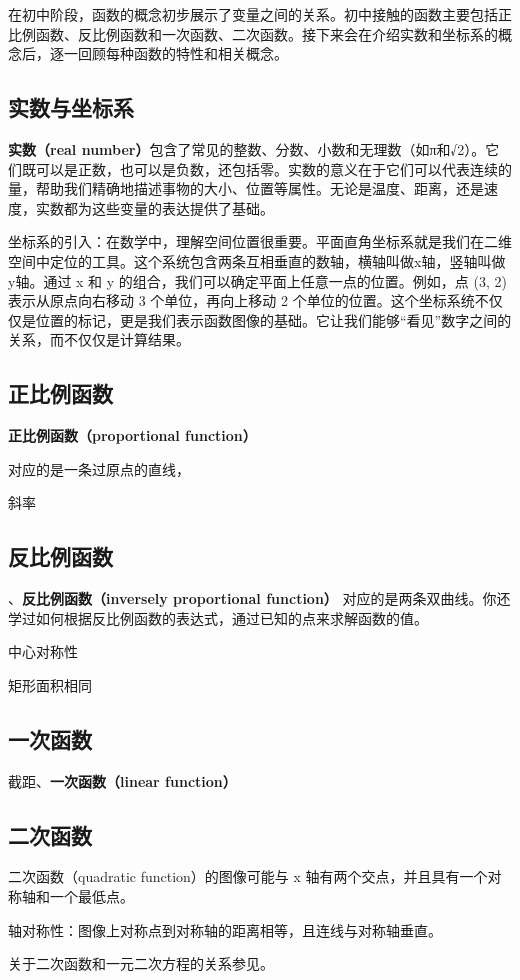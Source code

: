 
\begin{issues}
\issueDraft
\end{issues}

在初中阶段，函数的概念初步展示了变量之间的关系。初中接触的函数主要包括正比例函数、反比例函数和一次函数、二次函数。接下来会在介绍实数和坐标系的概念后，逐一回顾每种函数的特性和相关概念。

\subsection{实数与坐标系}

\textbf{实数（real number）}包含了常见的整数、分数、小数和无理数（如π和√2）。它们既可以是正数，也可以是负数，还包括零。实数的意义在于它们可以代表连续的量，帮助我们精确地描述事物的大小、位置等属性。无论是温度、距离，还是速度，实数都为这些变量的表达提供了基础。

坐标系的引入：在数学中，理解空间位置很重要。平面直角坐标系就是我们在二维空间中定位的工具。这个系统包含两条互相垂直的数轴，横轴叫做x轴，竖轴叫做y轴。通过 x 和 y 的组合，我们可以确定平面上任意一点的位置。例如，点 (3, 2) 表示从原点向右移动 3 个单位，再向上移动 2 个单位的位置。这个坐标系统不仅仅是位置的标记，更是我们表示函数图像的基础。它让我们能够“看见”数字之间的关系，而不仅仅是计算结果。



\subsection{正比例函数}

\textbf{正比例函数（proportional function）}

对应的是一条过原点的直线，

斜率


\subsection{反比例函数}

、\textbf{反比例函数（inversely proportional function）}
对应的是两条双曲线。你还学过如何根据反比例函数的表达式，通过已知的点来求解函数的值。

中心对称性

矩形面积相同


\subsection{一次函数}

截距、\textbf{一次函数（linear function）}

\subsection{二次函数}

二次函数（quadratic function）的图像可能与  x  轴有两个交点，并且具有一个对称轴和一个最低点。

轴对称性：图像上对称点到对称轴的距离相等，且连线与对称轴垂直。

关于二次函数和一元二次方程的关系参见。